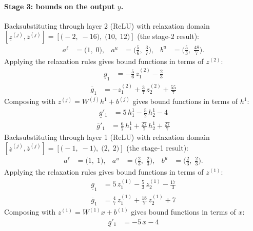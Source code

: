\documentclass[11pt]{article}
\begin{document}
\paragraph{Stage 3: bounds on the output $y$.}
Backsubstituting through layer 2 (ReLU) with relaxation domain $[\underline{z}^{(j)}, \overline{z}^{(j)}] = [\bigl(-2,\; -16\bigr),\; \bigl(10,\; 12\bigr)]$ (the stage-2 result):
\begin{align*}
a^{\ell} &= \bigl(1,\; 0\bigr), & a^{u} &= \bigl(\frac{5}{6},\; \frac{3}{7}\bigr), & b^{u} &= \bigl(\frac{5}{3},\; \frac{48}{7}\bigr).
\end{align*}
Applying the relaxation rules gives bound functions in terms of $z^{(2)}$:
\begin{align*}
\underline{g}_{1} &= -\frac{5}{6}\,z^{(2)}_{1} - \frac{2}{3}
\end{align*}
\begin{align*}
\overline{g}_{1} &= -z^{(2)}_{1} + \frac{3}{7}\,z^{(2)}_{2} + \frac{55}{7}
\end{align*}
Composing with $z^{(j)} = W^{(j)} h^{1} + b^{(j)}$ gives bound functions in terms of $h^{1}$:
\begin{align*}
\underline{g}'_{1} &= 5\,h^{1}_{1} - \frac{5}{2}\,h^{1}_{2} - 4
\end{align*}
\begin{align*}
\overline{g}'_{1} &= \frac{6}{7}\,h^{1}_{1} + \frac{27}{7}\,h^{1}_{2} + \frac{27}{7}
\end{align*}
Backsubstituting through layer 1 (ReLU) with relaxation domain $[\underline{z}^{(j)}, \overline{z}^{(j)}] = [\bigl(-1,\; -1\bigr),\; \bigl(2,\; 2\bigr)]$ (the stage-1 result):
\begin{align*}
a^{\ell} &= \bigl(1,\; 1\bigr), & a^{u} &= \bigl(\frac{2}{3},\; \frac{2}{3}\bigr), & b^{u} &= \bigl(\frac{2}{3},\; \frac{2}{3}\bigr).
\end{align*}
Applying the relaxation rules gives bound functions in terms of $z^{(1)}$:
\begin{align*}
\underline{g}_{1} &= 5\,z^{(1)}_{1} - \frac{5}{3}\,z^{(1)}_{2} - \frac{17}{3}
\end{align*}
\begin{align*}
\overline{g}_{1} &= \frac{4}{7}\,z^{(1)}_{1} + \frac{18}{7}\,z^{(1)}_{2} + 7
\end{align*}
Composing with $z^{(1)} = W^{(1)} x + b^{(1)}$ gives bound functions in terms of $x$:
\begin{align*}
\underline{g}'_{1} &= -5\,x - 4
\end{align*}
\end{document}
